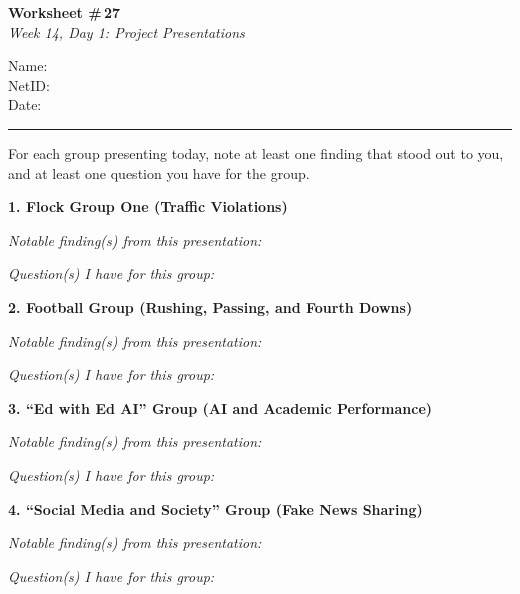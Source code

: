\documentclass[11pt]{article}
\newcommand{\blankspace}[1]{%
  \vspace{0.3em}
  \begin{minipage}[t][#1][t]{\linewidth}
  \end{minipage}
  \vspace{0.3em}
}
\newcommand{\talk}[4]{%
  \par\noindent\textbf{#1. #2}\par
  \vspace{0.3em}\noindent\textit{Notable finding(s) from this presentation:}\par
  \blankspace{#3}\par
  \vspace{0.4em}
  \noindent\textit{Question(s) I have for this group:}\par
  \blankspace{#4}\par
}
\begin{document}
\RaggedRight

\noindent
\begin{minipage}[t]{0.55\textwidth}
  \vspace{0pt}
  {\LARGE \textbf{Worksheet \#\,27}} \\[0.18em]
  {\large \textit{Week 14, Day 1: Project Presentations}}
\end{minipage}
\hfill
\begin{minipage}[t]{0.40\textwidth}
  \vspace{0pt}
  \small
  Name: \underline{\hspace{4.5cm}} \\[0.35em]
  NetID: \underline{\hspace{4.3cm}} \\[0.35em]
  Date: \underline{\hspace{4.4cm}} \\
\end{minipage}

\vspace{0.5em}
\noindent\rule{\linewidth}{0.6pt}
\vspace{0.3em}

For each group presenting today, note at least one finding that stood out to you, and at least one question you have for the group.

\vspace{0.6em}

\talk{1}{Flock Group One (Traffic Violations)}{2.0cm}{1.3cm}

\vspace{0.8cm}

\talk{2}{Football Group (Rushing, Passing, and Fourth Downs)}{2.0cm}{1.3cm}

\vspace{0.8cm}

\talk{3}{``Ed with Ed \makebox[0.5em]{\rotatebox[origin=c]{35}{\dsmedical}} AI'' Group (AI and Academic Performance)}{2.0cm}{1.3cm}

\newpage

\talk{4}{``Social Media and Society'' Group (Fake News Sharing)}{2.0cm}{1.3cm}
\end{document}
